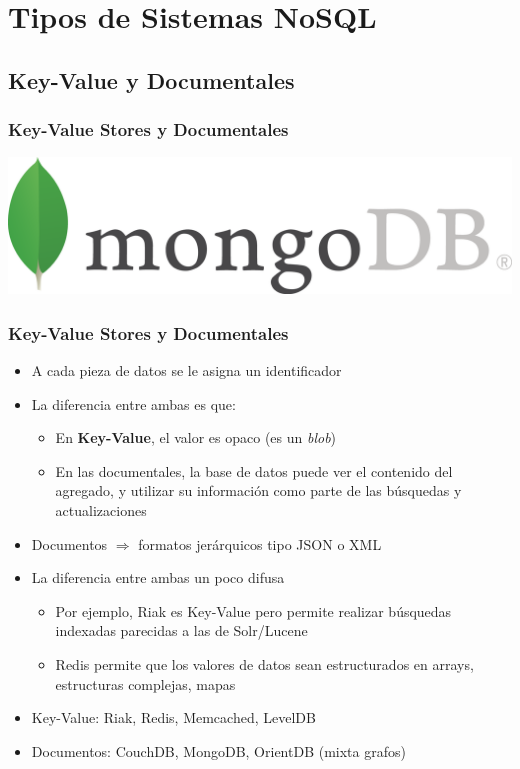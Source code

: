 \documentclass[14pt]{beamer}
\begin{document}
\section{Tipos de Sistemas NoSQL}


\subsection{Key-Value y Documentales}

\begin{frame}
  \frametitle{Key-Value Stores y Documentales}
  \includegraphics[width=\textwidth]{img/MongoDB}
\end{frame}

\begin{frame}[allowframebreaks]
  \frametitle{Key-Value Stores y Documentales}
\vspace*{-.9em}
\begin{itemize}
\item A cada pieza de datos se le asigna un identificador
\item La diferencia entre ambas es que:
  \begin{itemize}
  \item En {\bf Key-Value}, el valor es opaco (es un {\em blob\/})
  \item En las documentales, la base de datos puede ver el contenido del
    agregado, y utilizar su información como parte de las búsquedas y
    actualizaciones
\end{itemize}
\item Documentos $\Rightarrow$ formatos jerárquicos tipo JSON o XML
\framebreak
\item La diferencia entre ambas un poco difusa
  \begin{itemize}
  \item Por ejemplo, Riak es Key-Value pero permite realizar búsquedas
    indexadas parecidas a las de Solr/Lucene
\item Redis permite que los valores de datos sean estructurados en arrays,
  estructuras complejas, mapas
  \end{itemize}
\item Key-Value: Riak, Redis, Memcached, LevelDB
\item Documentos: CouchDB, MongoDB, OrientDB (mixta grafos)
\end{itemize}
\end{frame}
\end{document}
